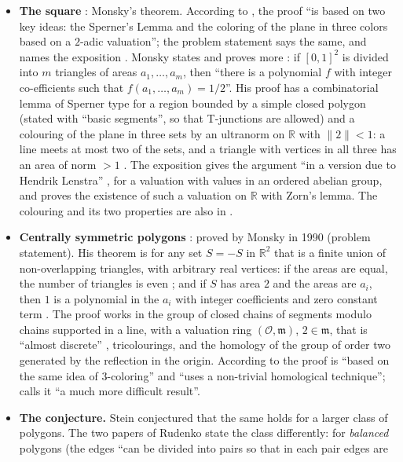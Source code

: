 \documentclass[11pt]{article}
\theoremstyle{definition}
\newcommand{\R}{\mathbb{R}}
\newcommand{\cO}{\mathcal{O}}
\newcommand{\m}{\mathfrak{m}}
\begin{document}
\begin{itemize}
\item \textbf{The square} \cite{Mon70}: Monsky's theorem. According to \cite[Section 1]{Rud12}, the
proof ``is based on two key ideas: the Sperner's Lemma and the coloring of the plane in three colors
based on a $2$-adic valuation''; the problem statement says the same, and names the exposition
\cite{AZ}. Monsky states and proves more \cite[pp.~161--162]{Mon70}: if $[0,1]^2$ is divided
into $m$ triangles of areas $a_1,\dots,a_m$, then ``there is a polynomial $f$ with integer
co-efficients such that $f(a_1,\dots,a_m)=1/2$''. His proof has a combinatorial lemma of Sperner
type for a region bounded by a simple closed polygon (stated with ``basic segments'', so that
T-junctions are allowed) and a colouring of the plane in three sets by an ultranorm on $\R$ with
$\|2\|<1$: a line meets at most two of the sets, and a triangle with vertices in all three has an
area of norm $>1$ \cite[pp.~162--163]{Mon70}. The exposition \cite[Chapter 22]{AZ} gives the
argument ``in a version due to Hendrik Lenstra'' \cite[p.~157]{AZ}, for a valuation with values in
an ordered abelian group, and proves the existence of such a valuation on $\R$ with Zorn's lemma.
The colouring and its two properties are also in \cite[Section 2, Lemma 1]{Rud12}.
\item \textbf{Centrally symmetric polygons} \cite{Mon90}: proved by Monsky in 1990 (problem
statement). His theorem is for any set $S=-S$ in $\R^2$ that is a finite union of non-overlapping
triangles, with arbitrary real vertices: if the areas are equal, the number of triangles is even
\cite[Theorem 3.8]{Mon90}; and if $S$ has area $2$ and the areas are $a_i$, then $1$ is a
polynomial in the $a_i$ with integer coefficients and zero constant term \cite[Theorem
3.10]{Mon90}. The proof works in the group of closed chains of segments modulo chains supported in
a line, with a valuation ring $(\cO,\m)$, $2\in\m$, that is ``almost discrete''
\cite[Definition 3.5]{Mon90}, tricolourings, and the homology of the group of order two generated
by the reflection in the origin. According to \cite[Section 1]{Rud12} the proof is ``based on the same idea of
$3$-coloring'' and ``uses a non-trivial homological technique''; \cite[Introduction]{Rud} calls it
``a much more difficult result''.
\item \textbf{The conjecture.} Stein \cite{Ste00} conjectured that the same holds for a larger
class of polygons. The two papers of Rudenko state the class differently: \cite{Rud12} for
\emph{balanced} polygons (the edges ``can be divided into pairs so that in each pair edges are

\end{itemize}
\end{document}
